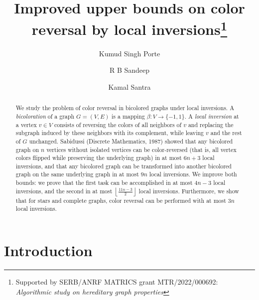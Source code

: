 \documentclass[runningheads,orivec]{llncs}
\begin{document}
\title{Improved upper bounds on color reversal by local inversions\thanks{Supported by SERB/ANRF MATRICS grant MTR/2022/000692: \textit{Algorithmic study on hereditary graph properties}}}


\author{Kumud Singh Porte \and
R B Sandeep  \and
Kamal Santra}
%

%
\maketitle              %
%

\begin{abstract}
We study the problem of color reversal in bicolored graphs under local inversions. A \emph{bicoloration} of a graph $G=(V,E)$ is a mapping $\beta: V \to \{-1,1\}$. A \emph{local inversion} at a vertex $v \in V$ consists of reversing the colors of all neighbors of $v$ and replacing the subgraph induced by these neighbors with its complement, while leaving $v$ and the rest of $G$ unchanged. Sabidussi (Discrete Mathematics, 1987) showed that any bicolored graph on $n$ vertices without isolated vertices can be color-reversed (that is, all vertex colors flipped while preserving the underlying graph) in at most $6n+3$ local inversions, and that any bicolored graph can be transformed into another bicolored graph on the same underlying graph in at most $9n$ local inversions. We improve both bounds: we prove that the first task can be accomplished in at most $4n-3$ local inversions, and the second in at most $ \left \lfloor \frac{11n-3}{2} \right \rfloor$ local inversions. Furthermore, we show that for stars and complete graphs, color reversal can be performed with at most $3n$ local inversions.

\end{abstract}

\section{Introduction}
\end{document}
